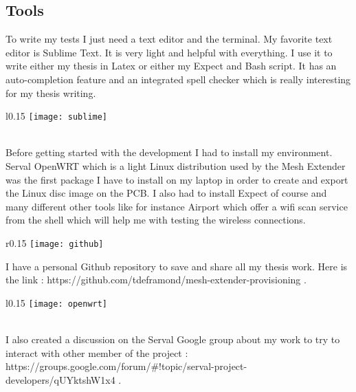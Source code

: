 \subsection{Tools}
To write my tests I just need a text editor and the terminal. My favorite text editor is Sublime Text. It is very light and helpful with everything. I use it to write either my thesis in Latex or either my Expect and Bash script. It has an auto-completion feature and an integrated spell checker which is really interesting for my thesis writing. 
\begin{wrapfigure}{l}{0.15\textwidth}
    \centering
    \texttt{[image: sublime]}
\end{wrapfigure}
\\
Before getting started with the development I had to install my environment. Serval OpenWRT which is a light Linux distribution used by the Mesh Extender was the first package I have to install on my laptop in order to create and export the Linux disc image on the PCB. I also had to install Expect of course and many different other tools like for instance Airport which offer a wifi scan service from the shell which will help me with testing the wireless connections.
\begin{wrapfigure}{r}{0.15\textwidth}
    \centering
    \texttt{[image: github]}
\end{wrapfigure}
\par
I have a personal Github repository to save and share all my thesis work. Here is the link : https://github.com/tdeframond/mesh-extender-provisioning .
\begin{wrapfigure}{l}{0.15\textwidth}
    \centering
    \texttt{[image: openwrt]}
\end{wrapfigure}
\\
I also created a discussion on the Serval Google group about my work to try to interact with other member of the project : https://groups.google.com/forum/\#!topic/serval-project-developers/qUYktshW1x4 . 

